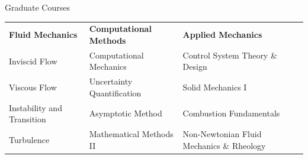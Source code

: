 \documentclass{resume} %
\begin{document}
\begin{rSection}{Graduate Courses}
\hspace{-.7cm}
\begin{tabular}{p{4.5cm}p{5cm}l}
\textbf{Fluid Mechanics} & \textbf{Computational Methods} & \textbf{Applied Mechanics}\\
Inviscid Flow & Computational Mechanics & Control System Theory \& Design \\
Viscous Flow & Uncertainty Quantification &  Solid Mechanics I \\
Instability and Transition & Asymptotic Method & Combustion Fundamentals \\
Turbulence & Mathematical Methods II & Non-Newtonian Fluid Mechanics \& Rheology
\end{tabular}

\end{rSection}

%
%
%
%
%
\end{document}
